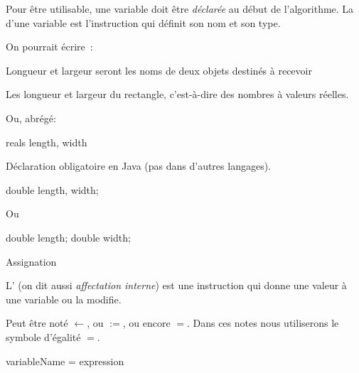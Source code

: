 \begin{hideedit}
\begin{frame}
  Pour être utilisable, une variable doit être \emph{déclarée} au
  début de l’algorithme. La 
  d’une variable est l’instruction qui définit son nom et son type.

  On pourrait écrire~:

  \begin{langagenaturel}
    Longueur et largeur seront les noms de deux
    objets destinés à recevoir

    Les longueur et largeur du rectangle,
    c’est-à-dire des nombres à valeurs réelles.

  \end{langagenaturel}

  Ou, abrégé:

  \begin{langagenaturel}
    reals length, width
  \end{langagenaturel}
\end{frame}

\begin{frame}[fragile]
  Déclaration obligatoire en Java (pas dans d'autres langages).

\begin{java}
double length, width;
\end{java}

Ou
\begin{java}
double length;
double width;
\end{java}
\end{frame}

\begin{frame}[fragile]{Assignation}
  \begin{definition}[Assignation]
    L’
    (on dit aussi \emph{affectation interne})
    est une instruction qui donne une valeur
    à une variable ou la modifie.
  \end{definition}


  Peut être noté
  $\leftarrow$, ou $:=$, ou encore $=$.
  Dans ces notes nous utiliserons le symbole d'égalité $=$.

  \begin{langagenaturel}
variableName = expression
  \end{langagenaturel}


\end{frame}
\end{hideedit}

